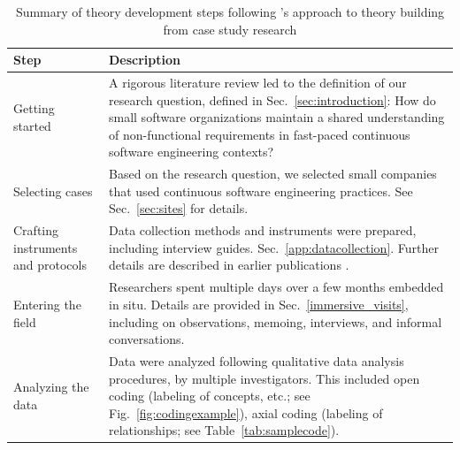 \documentclass[smallextended]{svjour3}        %
\providecommand{\DIFaddbeginFL}{} %
\providecommand{\DIFaddendFL}{} %
\providecommand{\DIFdelbeginFL}{} %
\providecommand{\DIFdelendFL}{} %
\newcommand{\DIFscaledelfig}{0.5}
\newlength{\DIFdelgraphicswidth} %
\newlength{\DIFdelgraphicsheight} %
\newcommand{\DIFaddincludegraphics}[2][]{{\color{blue}\fbox{\DIFOincludegraphics[#1]{#2}}}} %
\newcommand{\DIFdelincludegraphics}[2][]{%
\sbox{\DIFdelgraphicsbox}{\DIFOincludegraphics[#1]{#2}}%
\settoboxwidth{\DIFdelgraphicswidth}{\DIFdelgraphicsbox} %
\settoboxtotalheight{\DIFdelgraphicsheight}{\DIFdelgraphicsbox} %
\scalebox{\DIFscaledelfig}{%
\parbox[b]{\DIFdelgraphicswidth}{\usebox{\DIFdelgraphicsbox}\\[-\baselineskip] \rule{\DIFdelgraphicswidth}{0em}}\llap{\resizebox{\DIFdelgraphicswidth}{\DIFdelgraphicsheight}{%
\setlength{\unitlength}{\DIFdelgraphicswidth}%
\begin{picture}(1,1)%
\thicklines\linethickness{2pt} %
{\color[rgb]{1,0,0}\put(0,0){\framebox(1,1){}}}%
{\color[rgb]{1,0,0}\put(0,0){\line( 1,1){1}}}%
{\color[rgb]{1,0,0}\put(0,1){\line(1,-1){1}}}%
\end{picture}%
}\hspace*{3pt}}} %
} %
\DeclareRobustCommand{\DIFaddbeginFL}{\DIFOaddbeginFL \let\includegraphics\DIFaddincludegraphics} %
\DeclareRobustCommand{\DIFaddendFL}{\DIFOaddendFL \let\includegraphics\DIFOincludegraphics} %
\DeclareRobustCommand{\DIFdelbeginFL}{\DIFOdelbeginFL \let\includegraphics\DIFdelincludegraphics} %
\DeclareRobustCommand{\DIFdelendFL}{\DIFOaddendFL \let\includegraphics\DIFOincludegraphics} %
\begin{document}
\begin{table}[!h]
    \centering
    \caption{Summary of theory development steps following \citet{eisenhardt1989building}'s approach to theory building from case study research}
    \label{tab:theorizing}

\DIFdelbeginFL %
\DIFdelendFL \DIFaddbeginFL \begin{tabular}{P{2cm}p{9.6cm}}
\DIFaddendFL 

\toprule 
Step & Description \\
\midrule 

Getting started & A rigorous literature review led to the definition of our research question, defined in Sec.~\ref{sec:introduction}:  How do small software organizations maintain a shared understanding of non-functional requirements in fast-paced continuous software engineering contexts? \\

\addlinespace

Selecting cases & Based on the research question, we selected small companies that used continuous software engineering practices. See Sec.~\ref{sec:sites} for details. \\

\addlinespace

Crafting instruments and protocols & Data collection methods and instruments were prepared, including interview guides. Sec.~\ref{app:datacollection}. Further details are described in earlier publications \citep{werner2020re,werner_tse_2021,okpara_re2022,okpara_rej2023}.\\

\addlinespace

Entering the field & Researchers spent multiple days over a few months embedded in situ. Details are provided in Sec.~\ref{immersive_visits}, including on observations, memoing, interviews, and informal conversations.\\


\addlinespace

Analyzing the data & Data were analyzed following qualitative data analysis procedures, by multiple investigators. This included open coding (labeling of concepts, etc.; see Fig.~\ref{fig:codingexample}), axial coding (labeling of relationships; see Table~\ref{tab:samplecode}). \\


\end{tabular}
\end{table}
\end{document}
